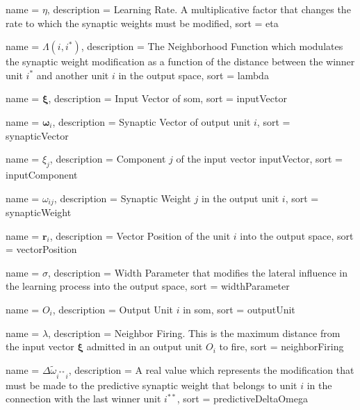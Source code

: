 {
  name = {\ensuremath{\eta}},
  description = {Learning Rate. A multiplicative factor that changes the rate to which the synaptic weights must be modified},
  sort  = eta
}

{
  name = {\ensuremath{\Lambda(i,i^*)}},
  description = {The Neighborhood Function which modulates the synaptic weight modification as a function of the distance between the winner unit $i^*$ and another unit $i$ in the output space},
  sort  = lambda
}

{
  name = {\ensuremath{\boldsymbol{\xi}}},
  description = {Input Vector of \ac{som}},
  sort  = inputVector
}

{
  name = {\ensuremath{\boldsymbol{\omega}_i}},
  description = {Synaptic Vector of output unit $i$},
  sort  = synapticVector
}

{
  name = {\ensuremath{\xi_j}},
  description = {Component $j$ of the input vector \ac{inputVector}},
  sort  = inputComponent
}

{
  name = {\ensuremath{\omega_{ij}}},
  description = {Synaptic Weight $j$ in the output unit $i$},
  sort  = synapticWeight
}

{
  name = {\ensuremath{\boldsymbol{r}_i}},
  description = {Vector Position of the unit $i$ into the output space},
  sort  = vectorPosition
}

{
  name = {\ensuremath{\sigma}},
  description = {Width Parameter that modifies the lateral influence in the learning process into the output space},
  sort  = widthParameter
}

{
  name = {\ensuremath{O_i}},
  description = {Output Unit $i$ in \ac{som}},
  sort  = outputUnit
}

{
  name = {\ensuremath{\lambda}},
  description = {Neighbor Firing. This is the maximum distance from the input vector $\boldsymbol{\xi}$ admitted in an output unit $O_i$ to fire},
  sort  = neighborFiring
}

{
  name = {\ensuremath{\Delta \tilde{\omega}_{i^{**}i}}},
  description = {A real value which represents the modification that must be made to the predictive synaptic weight that belongs to unit $i$ in the connection with the last winner unit $i^{**}$},
  sort  = predictiveDeltaOmega
}

